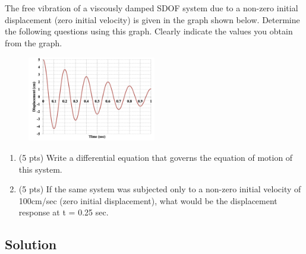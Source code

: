 \section{}
The free vibration of a viscously damped SDOF system due to a non-zero initial 
displacement (zero initial velocity) is given in the graph shown below. Determine the 
following questions using this graph. Clearly indicate the values you obtain from the graph.

\begin{figure}[h]
\centering
\includegraphics[width=0.5\textwidth]{Questions/Figures/q1 Graph.png}
\end{figure}

\begin{enumerate}[label=(\alph*)]
    \item (5 pts) Write a differential equation that governs the equation of motion of this 
    system.
    \item (5 pts) If the same system was subjected only to a non-zero initial velocity of 
    100cm/sec (zero initial displacement), what would be the displacement response at 
    t = 0.25 sec.
\end{enumerate}

\subsection*{Solution}
\subsection{}

